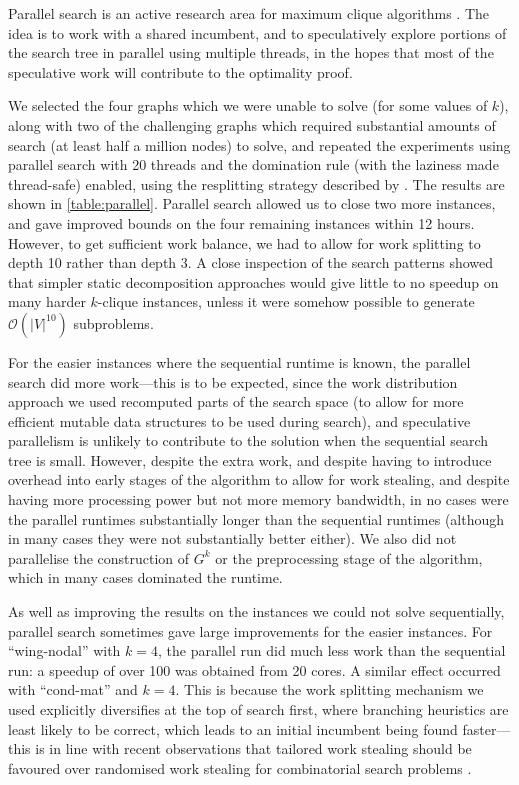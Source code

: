 \documentclass[letterpaper]{article}
\begin{document}
Parallel search is an active research area for maximum clique algorithms
\cite{DBLP:journals/algorithms/McCreeshP13,DBLP:journals/jcisd/DepolliKRTJ13,DBLP:journals/topc/McCreeshP15,DBLP:journals/cor/SegundoLP16}.
The idea is to work with a shared incumbent, and to speculatively explore portions of the search
tree in parallel using multiple threads, in the hopes that most of the speculative work will
contribute to the optimality proof.

We selected the four graphs which we were unable to solve (for some values of $k$), along with two
of the challenging graphs which required substantial amounts of search (at least half a million
nodes) to solve, and repeated the experiments using parallel search with 20 threads and the
domination rule (with the laziness made thread-safe) enabled, using the resplitting strategy
described by \citeauthor{DBLP:journals/topc/McCreeshP15} .
The results are shown in \cref{table:parallel}. Parallel search allowed us to close two more
instances, and gave improved bounds on the four remaining instances within 12 hours. However, to
get sufficient work balance, we had to allow for work splitting to depth 10 rather than depth 3. A
close inspection of the search patterns showed that simpler static decomposition approaches
\cite{DBLP:journals/jcisd/DepolliKRTJ13,DBLP:journals/cor/SegundoLP16} would give little to no
speedup on many harder $k$-clique instances, unless it were somehow possible to generate
$\mathcal{O}(|V|^{10})$ subproblems.

For the easier instances where the sequential runtime is known, the parallel search did more
work---this is to be expected, since the work distribution approach we used recomputed parts of the
search space (to allow for more efficient mutable data structures to be used during search), and
speculative parallelism is unlikely to contribute to the solution when the sequential search tree is
small. However, despite the extra work, and despite having to introduce overhead into early stages
of the algorithm to allow for work stealing, and despite having more processing power but not more
memory bandwidth, in no cases were the parallel runtimes substantially longer than the sequential
runtimes (although in many cases they were not substantially better either). We also did not
parallelise the construction of $G^k$ or the preprocessing stage of the algorithm, which in many
cases dominated the runtime.

As well as improving the results on the instances we could not solve sequentially, parallel search
sometimes gave large improvements for the easier instances. For ``wing-nodal'' with $k=4$, the
parallel run did much less work than the sequential run: a speedup of over 100 was obtained from 20
cores. A similar effect occurred with ``cond-mat'' and $k=4$. This is because the work splitting
mechanism we used explicitly diversifies at the top of search first, where branching heuristics are
least likely to be correct, which leads to an initial incumbent being found faster---this is in line
with recent observations that tailored work stealing should be favoured over randomised work
stealing for combinatorial search problems
\cite{DBLP:conf/cp/ChuSS09,DBLP:journals/topc/McCreeshP15}.
\end{document}
